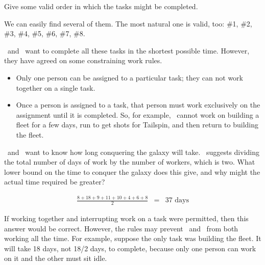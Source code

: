 \begin{problem}
\bparts

\ppart Give some valid order in which the tasks might be completed.

\begin{solution}
We can easily find several of them. The most natural one is valid, too:
\#1, \#2, \#3, \#4, \#5, \#6, \#7, \#8.

\end{solution}
\eparts

\Jay\  and \Rongrong\  want to complete all these tasks in the
shortest possible time. However, they have agreed on some constraining
work rules.
\begin{itemize}

\item Only one person can be assigned to a particular task; they can
not work together on a single task.

\item Once a person is assigned to a task, that person must work
exclusively on the assignment until it is completed.  So, for example,
\Jay\  cannot work on building a fleet for a few days, run to get shots
for Tailspin, and then return to building the fleet.

\end{itemize}


\bparts

\ppart \Jay\  and \Rongrong\  want to know how long conquering the
galaxy will take.  \Rongrong\  suggests dividing the total number of days of
work by the number of workers, which is two.  What lower bound on the time
to conquer the galaxy does this give, and why might the actual time
required be greater?

\begin{solution}
\begin{eqnarray*}
\frac{8 + 18 + 9 + 11 + 10 + 4 + 6 + 8}{2} & = & 37 \text{ days}
\end{eqnarray*}

If working together and interrupting work on a task were permitted, then
this answer would be correct.  However, the rules may prevent \Jay\  and
\Rongrong\  from both working all the time.  For example, suppose the only task
was building the fleet.  It will take 18 days, not 18/2 days, to complete,
because only one person can work on it and the other must sit idle.
\end{solution}


\end{problem}
